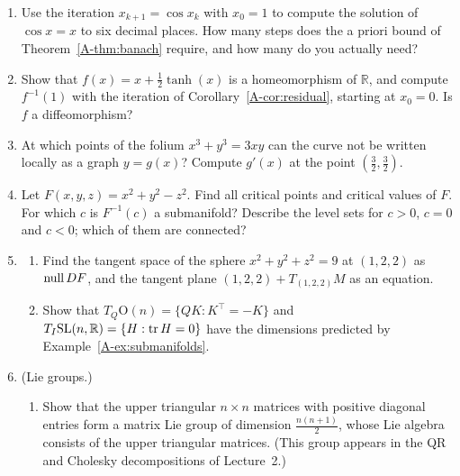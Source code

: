 \begin{enumerate}[leftmargin=*]
\begin{enumerate}[label=(\alph*)]
        \item Show that the unit circle $S^1$ is path-connected, and that the hyperbola $\{x^2 - y^2 = 1\}$ is not connected.
        \item Show that $\mathrm{SO}(2)$ is path-connected, and that $\mathrm{O}(2)$ is not connected.
        \item Show that no continuous injective map from $S^1$ to $\mathbb{R}$ exists. (Hint: intermediate value theorem.)
    \end{enumerate}
    \item Use the iteration $x_{k+1} = \cos x_k$ with $x_0 = 1$ to compute the solution of $\cos x = x$ to six decimal places. How many steps does the a priori bound of Theorem~\ref{A-thm:banach} require, and how many do you actually need?
    \item Show that $f(x) = x + \frac{1}{2}\tanh(x)$ is a homeomorphism of $\mathbb{R}$, and compute $f^{-1}(1)$ with the iteration of Corollary~\ref{A-cor:residual}, starting at $x_0 = 0$. Is $f$ a diffeomorphism?
    \item At which points of the folium $x^3 + y^3 = 3xy$ can the curve not be written locally as a graph $y = g(x)$? Compute $g'(x)$ at the point $(\frac{3}{2}, \frac{3}{2})$.
    \item Let $F(x, y, z) = x^2 + y^2 - z^2$. Find all critical points and critical values of $F$. For which $c$ is $F^{-1}(c)$ a submanifold? Describe the level sets for $c > 0$, $c = 0$ and $c < 0$; which of them are connected?
    \item \begin{enumerate}[label=(\alph*)]
        \item Find the tangent space of the sphere $x^2 + y^2 + z^2 = 9$ at $(1, 2, 2)$ as $\operatorname{null} DF$, and the tangent plane $(1, 2, 2) + T_{(1, 2, 2)}M$ as an equation.
        \item Show that $T_Q \mathrm{O}(n) = \{QK : K^\top = -K\}$ and $T_I \mathrm{SL}(n, \mathbb{R}) = \{H : \operatorname{tr} H = 0\}$ have the dimensions predicted by Example~\ref{A-ex:submanifolds}.
    \end{enumerate}
    \item (Lie groups.)
    \begin{enumerate}[label=(\alph*)]
        \item Show that the upper triangular $n \times n$ matrices with positive diagonal entries form a matrix Lie group of dimension $\frac{n(n+1)}{2}$, whose Lie algebra consists of the upper triangular matrices. (This group appears in the QR and Cholesky decompositions of Lecture~2.)

\end{enumerate}
\end{enumerate}
